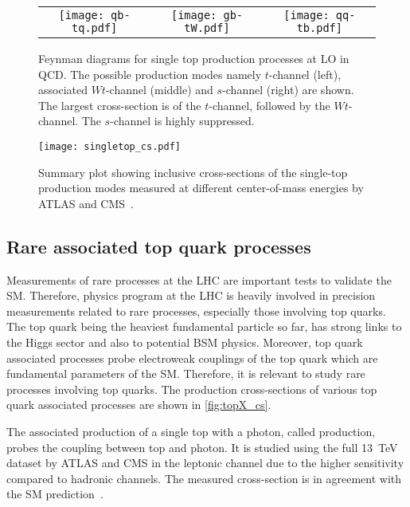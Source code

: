 \begin{figure}[htbp]
    \centering
    \begin{tabular}{ccc}
      \texttt{[image: qb-tq.pdf]} &
      \texttt{[image: gb-tW.pdf]} &
      \texttt{[image: qq-tb.pdf]} \\[1ex]
    \end{tabular}
    \caption[Feynman diagrams for single-top production processes at LO in QCD]{Feynman diagrams
    for single top production processes at LO in QCD. The possible production modes namely
    $t$-channel (left), associated $Wt$-channel (middle) and $s$-channel (right) are shown. The
    largest cross-section is of the $t$-channel, followed by the $Wt$-channel. The $s$-channel
    is highly suppressed.}
    \label{fig:topprod}
  \end{figure}
  
\begin{figure}[htbp]
    \centering
    \texttt{[image: singletop\_cs.pdf]}
    \caption[Cross-section of the single top production]{Summary plot showing inclusive cross-sections
    of the single-top production modes measured at different center-of-mass energies by ATLAS
    and CMS~\cite{ATL-PHYS-PUB-2024-006}.}%
    \label{fig:singletop_cs}
\end{figure}

\subsection{Rare associated top quark processes}
Measurements of rare processes at the LHC are important tests to validate the SM. Therefore,
physics program at the LHC is heavily involved in precision measurements related to rare processes,
especially those involving top quarks. 
The top quark being the heaviest fundamental particle so far, has strong links to the Higgs
sector and also to potential BSM physics. Moreover, top quark associated processes probe 
electroweak couplings of the top quark which are fundamental parameters of the SM. 
Therefore, it is relevant to study rare processes involving top quarks. The production 
cross-sections of various top quark associated processes are shown in \cref{fig:topX_cs}.

The associated production of a single top with a photon, called \tqgamma production, probes
the coupling between top and photon. It is studied using the full \SI{13}{\TeV} dataset by ATLAS
and CMS in the leptonic channel due to the higher sensitivity compared to hadronic channels. The
measured cross-section is in agreement with the SM prediction~\cite{PhysRevLett.131.181901}.

